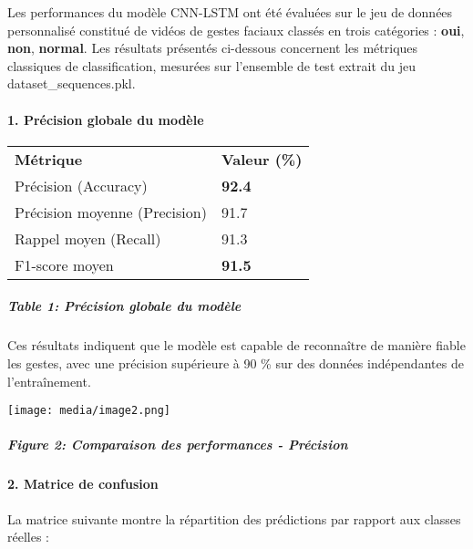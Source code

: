 \documentclass[
]{article}
\begin{document}
Les performances du modèle CNN-LSTM ont été évaluées sur le jeu de données personnalisé constitué de vidéos de gestes faciaux classés en trois catégories : \textbf{oui}, \textbf{non}, \textbf{normal}. Les résultats présentés ci-dessous concernent les métriques classiques de classification, mesurées sur l'ensemble de test extrait du jeu dataset\_sequences.pkl.

\hypertarget{pruxe9cision-globale-du-moduxe8le}{%
\paragraph{\texorpdfstring{\textbf{1. Précision globale du modèle}}{1. Précision globale du modèle}}\label{pruxe9cision-globale-du-moduxe8le}}

\begin{longtable}[]{@{}ll@{}}
\toprule
\endhead
\textbf{Métrique} & \textbf{Valeur (\%)} \\
Précision (Accuracy) & \textbf{92.4} \\
Précision moyenne (Precision) & 91.7 \\
Rappel moyen (Recall) & 91.3 \\
F1-score moyen & \textbf{91.5} \\
\bottomrule
\end{longtable}

\hypertarget{table-1-pruxe9cision-globale-du-moduxe8le}{%
\subparagraph{Table 1: Précision globale du modèle}\label{table-1-pruxe9cision-globale-du-moduxe8le}}

Ces résultats indiquent que le modèle est capable de reconnaître de manière fiable les gestes, avec une précision supérieure à 90 \% sur des données indépendantes de l'entraînement.

\texttt{[image: media/image2.png]}

\hypertarget{figure-2-comparaison-des-performances---pruxe9cision}{%
\subparagraph{Figure 2: Comparaison des performances - Précision}\label{figure-2-comparaison-des-performances---pruxe9cision}}

\hypertarget{matrice-de-confusion}{%
\paragraph{\texorpdfstring{\textbf{2. Matrice de confusion}}{2. Matrice de confusion}}\label{matrice-de-confusion}}

La matrice suivante montre la répartition des prédictions par rapport aux classes réelles :
\end{document}
